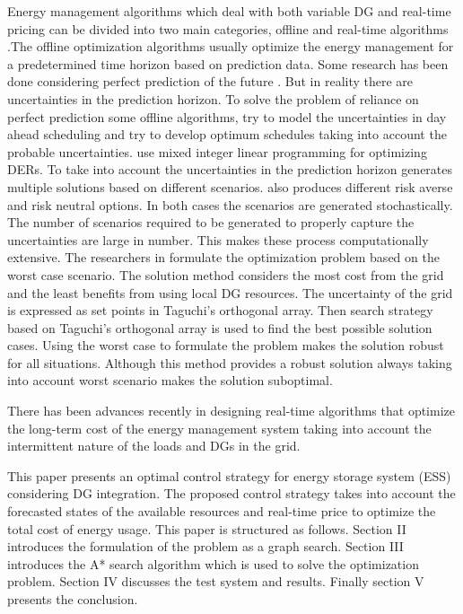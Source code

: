 Energy management algorithms which deal with both variable DG and real-time pricing can be divided into two main categories, offline and real-time algorithms \cite{rt_shi_2017}.The offline optimization algorithms usually optimize the energy management for a predetermined time horizon based on prediction data. Some research has been done considering perfect prediction of the future \cite{Off_1,off_2,off_3,off_4}. But in reality there are uncertainties in the prediction horizon. To solve the problem of reliance on perfect prediction some offline algorithms, try to model the uncertainties in day ahead scheduling and try to develop optimum schedules taking into account the probable uncertainties. \cite{ous_1,ous_2} use mixed integer linear programming for optimizing DERs. To take into account the uncertainties in the prediction horizon \cite{ous_2} generates multiple solutions based on different scenarios. \cite{ous_1} also produces different risk averse and risk neutral options. In both cases the scenarios are generated stochastically. The number of scenarios required to be generated to properly capture the uncertainties are large in number. This makes these process computationally extensive. The researchers in \cite{ous_3} formulate the optimization problem based on the worst case scenario. The solution method considers the most cost from the grid and the least benefits from using local DG resources. The uncertainty of the grid is expressed as set points in Taguchi’s orthogonal array. Then search strategy based on Taguchi’s orthogonal array is used to find the best possible solution cases. Using the worst case to formulate the problem makes the solution robust for all situations. Although this method provides a robust solution always taking into account worst scenario makes the solution suboptimal. 

There has been advances recently in designing real-time algorithms that optimize the long-term cost of the energy management system taking into account the intermittent nature of the loads and DGs in the grid. 


This paper presents an optimal control strategy for energy storage system (ESS) considering DG integration. The proposed control strategy takes into account the forecasted states of the available resources and real-time price to optimize the total cost of energy usage. This paper is structured as follows. Section II introduces the formulation of the problem as a graph search. Section III introduces the A* search algorithm which is used to solve the optimization problem. Section IV discusses the test system and results. Finally section V presents the conclusion.

